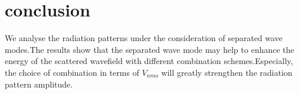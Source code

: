 \section{conclusion}
We analyse the radiation patterns under the consideration of separated wave modes.The
results show that the separated wave mode may help to enhance the energy of the
scattered wavefield with different combination schemes.Especially, the choice of
combination in terms of $V_{nmo}$ will greatly strengthen the radiation pattern
amplitude.
